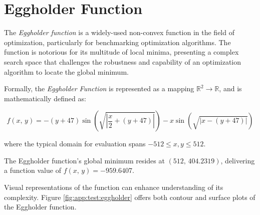 \section{Eggholder Function}
\label{sec:app:test:eggholder}
  The \emph{Eggholder function} is a widely-used non-convex function in the 
  field of optimization, particularly for benchmarking optimization algorithms.
  The function is notorious for its multitude of local minima, presenting a 
  complex search space that challenges the robustness and capability of an 
  optimization algorithm to locate the global minimum.

  \begin{definition}
  Formally, the \emph{Eggholder Function} is represented as a mapping 
  \(\mathbb{R}^2 \to \mathbb{R}\), and is mathematically defined as:

  \begin{equation}
    f(x,\, y) = 
      -(y + 47) \sin\left(\sqrt{\left| \frac{x}{2} + (y + 47) \right|}\right) 
      - x \sin\left(\sqrt{\left| x - (y + 47) \right|}\right)
  \end{equation}

  where the typical domain for evaluation spans \(-512 \leq x, y \leq 512\).
  \end{definition}

  The Eggholder function's global minimum resides at \((512,\, 404.2319)\), 
  delivering a function value of \(f(x,\, y) = -959.6407\).

  Visual representations of the function can enhance understanding of its 
  complexity.
  Figure \vref{fig:app:test:eggholder} offers both contour and surface plots of 
  the Eggholder function.

